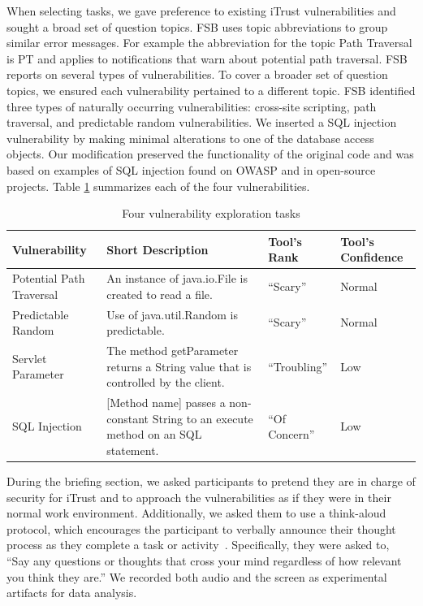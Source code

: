\documentclass[conference]{IEEEtran}
\begin{document}
When selecting tasks, we gave preference to existing iTrust vulnerabilities and sought a broad set of question topics.  
FSB uses topic abbreviations to group similar error messages. 
For example the abbreviation for the topic Path Traversal is PT and applies to notifications that warn about potential path traversal. 
FSB reports on several types of vulnerabilities. 
To cover a broader set of question topics, we ensured each vulnerability pertained to a different topic.
FSB identified three types of naturally occurring vulnerabilities: cross-site scripting, path traversal, and predictable random vulnerabilities.
We inserted a SQL injection vulnerability by making minimal alterations to one of the database access objects.
Our modification preserved the functionality of the original code and was based on examples of SQL injection found on OWASP and in open-source projects.
Table \ref{table:vulnerabilities} summarizes each of the four vulnerabilities. 

\begin{table} 
\centering
\caption{Four vulnerability exploration tasks}
\begin{tabular}{|l|l|l|l|}
\rowcolor{gray!50}
\hline
    Vulnerability				& Short Description													& Tool's Rank 						& Tool's Confidence\\
    \hline	
    Potential Path Traversal	& An instance of java.io.File is created to read a file.     			& ``Scary''							 	&  Normal\\
    \hline
    Predictable Random			& Use of java.util.Random is predictable. 								& ``Scary''								&  Normal\\
    \hline
    Servlet Parameter 			& The method getParameter returns a String value that is controlled by the client.			& ``Troubling''		&  Low\\
    \hline
    SQL Injection				& [Method name] passes a non-constant String to an execute method on an SQL statement.     	& ``Of Concern''		&  Low\\
    \hline
\end{tabular}
\label{table:vulnerabilities}
\end{table}

During the briefing section, we asked participants to pretend they are in charge of security for iTrust and to approach the vulnerabilities as if they were in their normal work environment.
Additionally, we asked them to use a think-aloud protocol, which encourages the participant to verbally announce their thought process as they complete a task or activity~\cite{nielsen2002getting}. 
Specifically, they were asked to, ``Say any questions or thoughts that cross your mind regardless of how relevant you think they are.''
We recorded both audio and the screen as experimental artifacts for data analysis.
\end{document}
